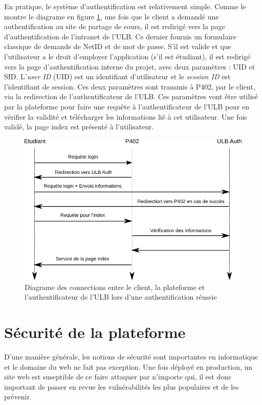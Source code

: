 \documentclass[a4paper,12pt]{article}
\begin{document}
En pratique, le système d'authentification est relativement simple. Comme le montre
le diagrame en figure \ref{fig:auth}, une fois que le client a demandé une
authentification au site de partage de cours, il est redirigé vers la page d'authentification
de l'intranet de l'ULB. Ce dernier fournis un formulaire classique de demande de
NetID et de mot de passe. S'il est valide et que l'utilisateur a le droit d'employer
l'application (s'il est étudiant), il est redirigé vers la page d'authentification
interne du projet, avec deux paramètres : UID et SID. L'\textit{user ID} (UID) est
un identifiant d'utilisateur et le \textit{session ID} est l'identifiant de session.
Ces deux paramètres sont transmis à P402, par le client, via la redirection de l'authentificateur
de l'ULB. Ces paramètres vont être utilisé par la plateforme pour faire
une requète à l'authentificateur de l'ULB pour en vérifier la validité et télécharger
les informations lié à cet utilisateur. Une fois validé, la page index est présenté à
l'utilisateur.

\begin{figure}
  \centering\includegraphics[scale=0.9]{imgs/auth.pdf}
  \caption{Diagrame des connections entre le client, la plateforme et l'authentificateur
de l'ULB lors d'une authentification réussie}
  \label{fig:auth}
\end{figure}

\section{Sécurité de la plateforme}

D'une manière générale, les notions de sécurité sont importantes en informatique
et le domaine du web ne fait pas exception. Une fois déployé en production,
un site web est suseptible de ce faire attaquer par n'importe qui, il est donc
important de passer en revue les vulnérabilités les plus populaires et de les prévenir.
\end{document}
